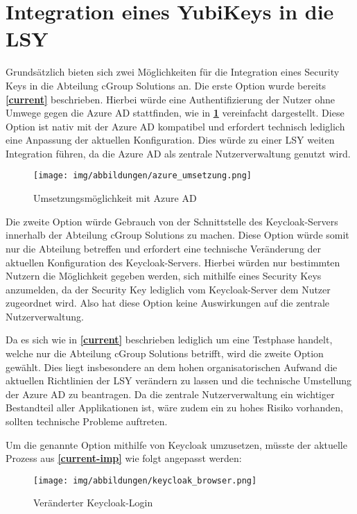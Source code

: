 \section{Integration eines YubiKeys in die LSY}

Grundsätzlich bieten sich zwei Möglichkeiten für die Integration eines Security Keys in die Abteilung cGroup Solutions an. Die erste Option wurde bereits \textbf{\ref{current}} beschrieben. Hierbei würde eine Authentifizierung der Nutzer ohne Umwege gegen die Azure \ac{AD} stattfinden, wie in \textbf{\ref{azure-imp}} vereinfacht dargestellt. Diese Option ist nativ mit der Azure \ac{AD} kompatibel und erfordert technisch lediglich eine Anpassung der aktuellen Konfiguration. Dies würde zu einer \ac{LSY} weiten Integration führen, da die Azure \ac{AD} als zentrale Nutzerverwaltung genutzt wird.

\begin{figure}[h]
	\centering 
	\texttt{[image: img/abbildungen/azure\_umsetzung.png]}
	\captionsetup{format=hang}
	\caption{Umsetzungsmöglichkeit mit Azure \ac{AD}} \label{azure-imp}
\end{figure}

Die zweite Option würde Gebrauch von der Schnittstelle des Keycloak-Servers innerhalb der Abteilung cGroup Solutions zu machen. Diese Option würde somit nur die Abteilung betreffen und erfordert eine technische Veränderung der aktuellen Konfiguration des Keycloak-Servers. Hierbei würden nur bestimmten Nutzern die Möglichkeit gegeben werden, sich mithilfe eines Security Keys anzumelden, da der Security Key lediglich vom Keycloak-Server dem Nutzer zugeordnet wird. Also hat diese Option keine Auswirkungen auf die zentrale Nutzerverwaltung. 

Da es sich wie in \textbf{\ref{current}} beschrieben lediglich um eine Testphase handelt, welche nur die Abteilung cGroup Solutions betrifft, wird die zweite Option gewählt. Dies liegt insbesondere an dem hohen organisatorischen Aufwand die aktuellen Richtlinien der \ac{LSY} verändern zu lassen und die technische Umstellung der Azure \ac{AD} zu beantragen. Da die zentrale Nutzerverwaltung ein wichtiger Bestandteil aller Applikationen ist, wäre zudem ein zu hohes Risiko vorhanden, sollten technische Probleme auftreten. 

Um die genannte Option mithilfe von Keycloak umzusetzen, müsste der aktuelle Prozess aus \textbf{\ref{current-imp}} wie folgt angepasst werden:

\begin{figure}[H]
	\centering 
	\texttt{[image: img/abbildungen/keycloak\_browser.png]}
	\captionsetup{format=hang}
	\caption{Veränderter Keycloak-Login}
\end{figure}

